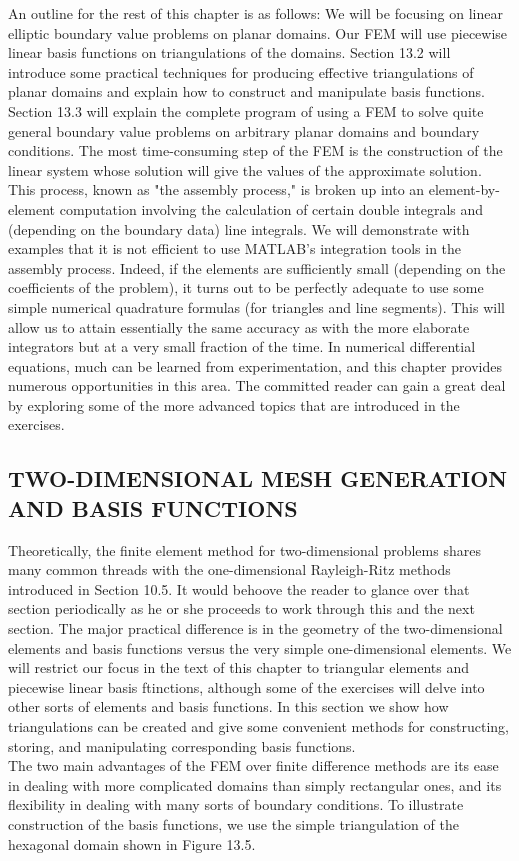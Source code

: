 \documentclass[../main.tex]{subfiles}
\begin{document}
An outline for the rest of this chapter is as follows: We will be focusing on linear 
elliptic boundary value problems on planar domains. Our FEM will use piecewise 
linear basis functions on triangulations of the domains. Section 13.2 will 
introduce some practical techniques for producing effective triangulations of 
planar domains and explain how to construct and manipulate basis functions. 
Section 13.3 will explain the complete program of using a FEM to solve quite 
general boundary value problems on arbitrary planar domains and boundary 
conditions. The most time-consuming step of the FEM is the construction of the 
linear system whose solution will give the values of the approximate solution. 
This process, known as "the assembly process," is broken up into an element-by-element computation involving the calculation of certain double integrals and 
(depending on the boundary data) line integrals. We will demonstrate with 
examples that it is not efficient to use MATLAB's integration tools in the 
assembly process. Indeed, if the elements are sufficiently small (depending on the coefficients of the problem), it turns out to be perfectly adequate to use some 
simple numerical quadrature formulas (for triangles and line segments). This will 
allow us to attain essentially the same accuracy as with the more elaborate 
integrators but at a very small fraction of the time. In numerical differential 
equations, much can be learned from experimentation, and this chapter provides 
numerous opportunities in this area. The committed reader can gain a great deal 
by exploring some of the more advanced topics that are introduced in the 
exercises. 

\subsection{TWO-DIMENSIONAL MESH GENERATION AND BASIS 
FUNCTIONS}

Theoretically, the finite element method for two-dimensional problems shares 
many common threads with the one-dimensional Rayleigh-Ritz methods 
introduced in Section 10.5. It would behoove the reader to glance over that 
section periodically as he or she proceeds to work through this and the next 
section. The major practical difference is in the geometry of the two-dimensional 
elements and basis functions versus the very simple one-dimensional elements. 
We will restrict our focus in the text of this chapter to triangular elements and 
piecewise linear basis ftinctions, although some of the exercises will delve into 
other sorts of elements and basis functions. In this section we show how 
triangulations can be created and give some convenient methods for constructing, 
storing, and manipulating corresponding basis functions. 
\\
The two main advantages of the FEM over finite difference methods are its ease in 
dealing with more complicated domains than simply rectangular ones, and its 
flexibility in dealing with many sorts of boundary conditions. To illustrate 
construction of the basis functions, we use the simple triangulation of the 
hexagonal domain shown in Figure 13.5.
\end{document}
